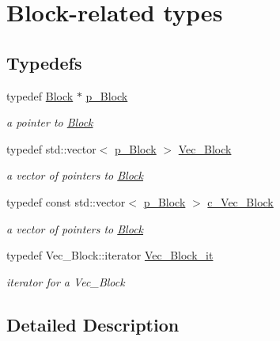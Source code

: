 \hypertarget{group___block___t_y_p_e_s}{}\section{Block-\/related types}
\label{group___block___t_y_p_e_s}
\subsection*{Typedefs}
\begin{DoxyCompactItemize}
\item 
\mbox{\label{group___block___t_y_p_e_s_ga753932d88360bdd26edd3ad0397c99f9}} 
typedef \mbox{\hyperlink{class_s_m_spp__di__unipi__it_1_1_block}{Block}} $\ast$ \mbox{\hyperlink{group___block___t_y_p_e_s_ga753932d88360bdd26edd3ad0397c99f9}{p\+\_\+\+Block}}
\begin{DoxyCompactList}\small\item\em a pointer to \mbox{\hyperlink{class_s_m_spp__di__unipi__it_1_1_block}{Block}} \end{DoxyCompactList}\item 
\mbox{\label{group___block___t_y_p_e_s_gaf2535d74ac0260546452f729dcc5b9f3}} 
typedef std\+::vector$<$ \mbox{\hyperlink{group___block___t_y_p_e_s_ga753932d88360bdd26edd3ad0397c99f9}{p\+\_\+\+Block}} $>$ \mbox{\hyperlink{group___block___t_y_p_e_s_gaf2535d74ac0260546452f729dcc5b9f3}{Vec\+\_\+\+Block}}
\begin{DoxyCompactList}\small\item\em a vector of pointers to \mbox{\hyperlink{class_s_m_spp__di__unipi__it_1_1_block}{Block}} \end{DoxyCompactList}\item 
\mbox{\label{group___block___t_y_p_e_s_ga7cbe2d2777d0b63cf75c041bf7e60dff}} 
typedef const std\+::vector$<$ \mbox{\hyperlink{group___block___t_y_p_e_s_ga753932d88360bdd26edd3ad0397c99f9}{p\+\_\+\+Block}} $>$ \mbox{\hyperlink{group___block___t_y_p_e_s_ga7cbe2d2777d0b63cf75c041bf7e60dff}{c\+\_\+\+Vec\+\_\+\+Block}}
\begin{DoxyCompactList}\small\item\em a vector of pointers to \mbox{\hyperlink{class_s_m_spp__di__unipi__it_1_1_block}{Block}} \end{DoxyCompactList}\item 
\mbox{\label{group___block___t_y_p_e_s_ga106f39b1bd552b44399d6c3484e5d6bd}} 
typedef Vec\+\_\+\+Block\+::iterator \mbox{\hyperlink{group___block___t_y_p_e_s_ga106f39b1bd552b44399d6c3484e5d6bd}{Vec\+\_\+\+Block\+\_\+it}}
\begin{DoxyCompactList}\small\item\em iterator for a Vec\+\_\+\+Block \end{DoxyCompactList}\end{DoxyCompactItemize}


\subsection{Detailed Description}
